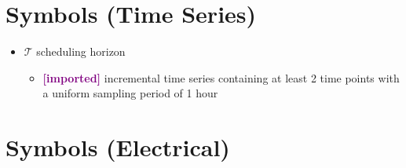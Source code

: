 \documentclass{article}
\newcommand{\imported}{\textcolor{purple}{\textbf{[imported] }}}
\def\sT{\mathcal T}
\begin{document}
\section{Symbols (Time Series)}
\begin{itemize}
\item $\sT$ scheduling horizon
  \begin{itemize}
  \item \imported incremental time series containing at least 2 time points with
    a uniform sampling period of 1 hour
  \end{itemize}
\end{itemize}



\section{Symbols (Electrical)}
\end{document}
